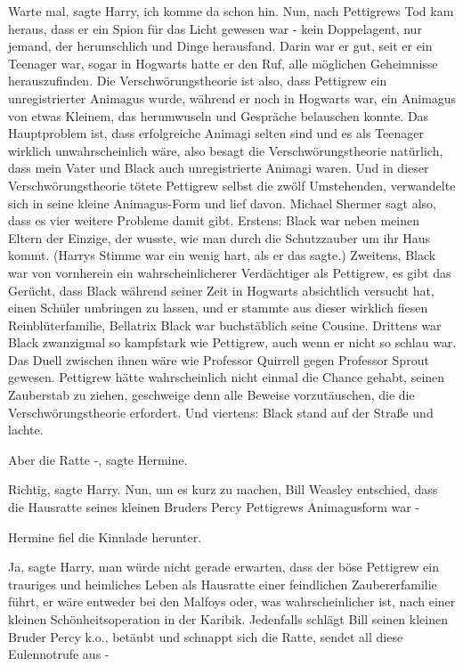 \glqq{}Warte mal\grqq{}, sagte Harry, \glqq{}ich komme da schon hin. Nun, nach
Pettigrews Tod kam heraus, dass er ein Spion für das Licht gewesen war - kein
Doppelagent, nur jemand, der herumschlich und Dinge herausfand. Darin war er
gut, seit er ein Teenager war, sogar in Hogwarts hatte er den Ruf, alle
möglichen Geheimnisse herauszufinden. Die Verschwörungstheorie ist also, dass
Pettigrew ein unregistrierter Animagus wurde, während er noch in Hogwarts war,
ein Animagus von etwas Kleinem, das herumwuseln und Gespräche belauschen konnte.
Das Hauptproblem ist, dass erfolgreiche Animagi selten sind und es als Teenager
wirklich unwahrscheinlich wäre, also besagt die Verschwörungstheorie natürlich,
dass mein Vater und Black auch unregistrierte Animagi waren. Und in dieser
Verschwörungstheorie tötete Pettigrew selbst die zwölf Umstehenden, verwandelte
sich in seine kleine Animagus-Form und lief davon. Michael Shermer sagt also,
dass es vier weitere Probleme damit gibt. Erstens: Black war neben meinen Eltern
der Einzige, der wusste, wie man durch die Schutzzauber um ihr Haus
kommt.\grqq{} (Harrys Stimme war ein wenig hart, als er das sagte.)
\glqq{}Zweitens, Black war von vornherein ein wahrscheinlicherer Verdächtiger
als Pettigrew, es gibt das Gerücht, dass Black während seiner Zeit in Hogwarts
absichtlich versucht hat, einen Schüler umbringen zu lassen, und er stammte aus
dieser wirklich fiesen Reinblüterfamilie, Bellatrix Black war buchstäblich seine
Cousine. Drittens war Black zwanzigmal so kampfstark wie Pettigrew, auch wenn er
nicht so schlau war. Das Duell zwischen ihnen wäre wie Professor Quirrell gegen
Professor Sprout gewesen. Pettigrew hätte wahrscheinlich nicht einmal die Chance
gehabt, seinen Zauberstab zu ziehen, geschweige denn alle Beweise vorzutäuschen,
die die Verschwörungstheorie erfordert. Und viertens: Black stand auf der Straße
und lachte.\grqq{}

\glqq{}Aber die Ratte -\grqq{}, sagte Hermine.

\glqq{}Richtig\grqq{}, sagte Harry. \glqq{}Nun, um es kurz zu machen, Bill
Weasley entschied, dass die Hausratte seines kleinen Bruders Percy Pettigrews
Animagusform war -\grqq{}

Hermine fiel die Kinnlade herunter.

\glqq{}Ja\grqq{}, sagte Harry, \glqq{}man würde nicht gerade erwarten, dass der
böse Pettigrew ein trauriges und heimliches Leben als Hausratte einer
feindlichen Zaubererfamilie führt, er wäre entweder bei den Malfoys oder, was
wahrscheinlicher ist, nach einer kleinen Schönheitsoperation in der Karibik.
Jedenfalls schlägt Bill seinen kleinen Bruder Percy k.o., betäubt und schnappt
sich die Ratte, sendet all diese Eulennotrufe aus -\grqq{}

